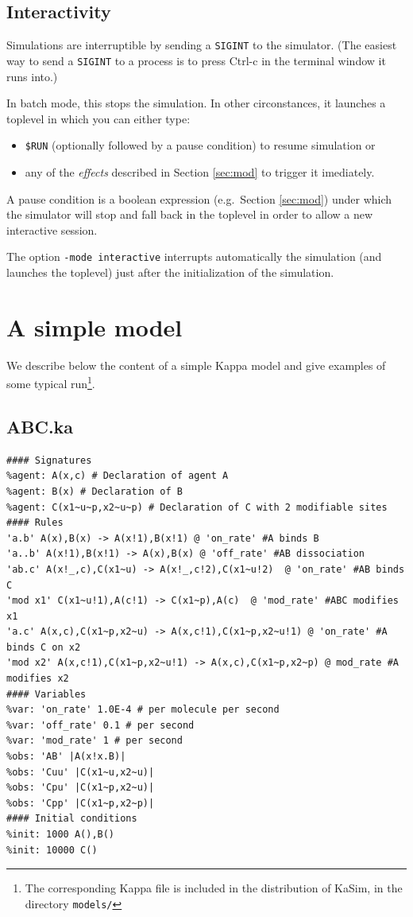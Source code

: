 \documentclass[11pt]{book}
\def\KaSim{\textsf{KaSim}}
\def\ttt#1{\texttt{#1}}
\def\eg{e.g.~}
\begin{document}
\section{Interactivity}
Simulations are interruptible by sending a \verb:SIGINT: to the
simulator. (The easiest way to send a \verb:SIGINT: to a process is to
press Ctrl-c in the terminal window it runs into.)

In batch mode, this stops the simulation. In other circonstances, it
launches a toplevel in which you can either type:
\begin{itemize}
\item \verb:$RUN: (optionally followed by a pause condition) to resume
  simulation or
\item any of the \emph{effects} described in Section \ref{sec:mod} to trigger it imediately.
\end{itemize}

A pause condition is a boolean expression ({\eg}Section \ref{sec:mod}) under which the simulator will stop and fall back in
the toplevel in order to allow a new interactive session.

The option \ttt{-mode interactive} interrupts automatically the
simulation (and launches the toplevel) just after the initialization
of the simulation.

\chapter{A simple model}\label{chap:abc}

We describe below the content of a simple Kappa model and give examples of some typical run\footnote{The corresponding Kappa file is included in the distribution of \KaSim, in the directory \ttt{models/}}.

\section{ABC.ka}
\begin{lstlisting}[language=kappa]
#### Signatures
%agent: A(x,c) # Declaration of agent A
%agent: B(x) # Declaration of B
%agent: C(x1~u~p,x2~u~p) # Declaration of C with 2 modifiable sites
#### Rules
'a.b' A(x),B(x) -> A(x!1),B(x!1) @ 'on_rate' #A binds B
'a..b' A(x!1),B(x!1) -> A(x),B(x) @ 'off_rate' #AB dissociation
'ab.c' A(x!_,c),C(x1~u) -> A(x!_,c!2),C(x1~u!2)  @ 'on_rate' #AB binds C
'mod x1' C(x1~u!1),A(c!1) -> C(x1~p),A(c)  @ 'mod_rate' #ABC modifies x1
'a.c' A(x,c),C(x1~p,x2~u) -> A(x,c!1),C(x1~p,x2~u!1) @ 'on_rate' #A binds C on x2
'mod x2' A(x,c!1),C(x1~p,x2~u!1) -> A(x,c),C(x1~p,x2~p) @ mod_rate #A modifies x2
#### Variables
%var: 'on_rate' 1.0E-4 # per molecule per second
%var: 'off_rate' 0.1 # per second
%var: 'mod_rate' 1 # per second
%obs: 'AB' |A(x!x.B)|
%obs: 'Cuu' |C(x1~u,x2~u)|
%obs: 'Cpu' |C(x1~p,x2~u)|
%obs: 'Cpp' |C(x1~p,x2~p)|
#### Initial conditions
%init: 1000 A(),B()
%init: 10000 C()
\end{lstlisting}
\end{document}
